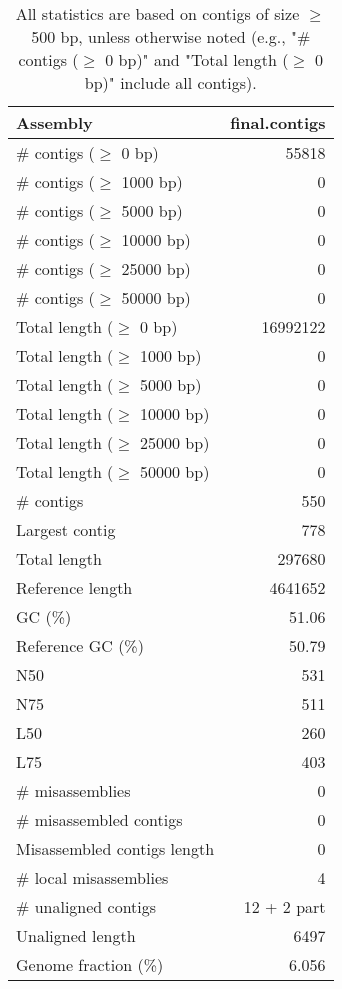 \documentclass[12pt,a4paper]{article}
\begin{document}
\begin{table}[ht]
\begin{center}
\caption{All statistics are based on contigs of size $\geq$ 500 bp, unless otherwise noted (e.g., "\# contigs ($\geq$ 0 bp)" and "Total length ($\geq$ 0 bp)" include all contigs).}
\begin{tabular}{|l*{1}{|r}|}
\hline
Assembly & final.contigs \\ \hline
\# contigs ($\geq$ 0 bp) & 55818 \\ \hline
\# contigs ($\geq$ 1000 bp) & 0 \\ \hline
\# contigs ($\geq$ 5000 bp) & 0 \\ \hline
\# contigs ($\geq$ 10000 bp) & 0 \\ \hline
\# contigs ($\geq$ 25000 bp) & 0 \\ \hline
\# contigs ($\geq$ 50000 bp) & 0 \\ \hline
Total length ($\geq$ 0 bp) & 16992122 \\ \hline
Total length ($\geq$ 1000 bp) & 0 \\ \hline
Total length ($\geq$ 5000 bp) & 0 \\ \hline
Total length ($\geq$ 10000 bp) & 0 \\ \hline
Total length ($\geq$ 25000 bp) & 0 \\ \hline
Total length ($\geq$ 50000 bp) & 0 \\ \hline
\# contigs & 550 \\ \hline
Largest contig & 778 \\ \hline
Total length & 297680 \\ \hline
Reference length & 4641652 \\ \hline
GC (\%) & 51.06 \\ \hline
Reference GC (\%) & 50.79 \\ \hline
N50 & 531 \\ \hline
N75 & 511 \\ \hline
L50 & 260 \\ \hline
L75 & 403 \\ \hline
\# misassemblies & 0 \\ \hline
\# misassembled contigs & 0 \\ \hline
Misassembled contigs length & 0 \\ \hline
\# local misassemblies & 4 \\ \hline
\# unaligned contigs & 12 + 2 part \\ \hline
Unaligned length & 6497 \\ \hline
Genome fraction (\%) & 6.056 \\ \hline

\end{tabular}
\end{center}
\end{table}
\end{document}
